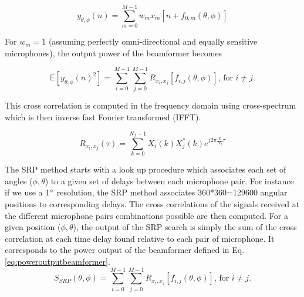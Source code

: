 \begin{equation}
    y_{\theta,\phi}(n)=\sum\limits_{m=0}^{M-1}{w_m x_m[n + f_{0,m}(\theta,\phi)]} 
\end{equation}


For $w_m=1$ (assuming perfectly omni-directional and equally sensitive microphones), the output power of the beamformer becomes

\begin{equation}
    \mathbb{E}[{y_{\theta,\phi}(n)^2}]=\sum\limits_{i=0}^{M-1}\sum\limits_{j=0}^{M-1}{R_{x_i,x_j}[f_{i,j}(\theta,\phi)]} \text{, for } i\neq j.
    \label{eq:poweroutputbeamformer}
\end{equation}

This cross correlation is computed in the frequency domain using cross-spectrum which is then inverse fast Fourier transformed (IFFT).

\begin{equation}
    R_{x_i,x_j}(\tau)= \sum\limits_{k=0}^{N_{f}-1}{X_{i}(k)X_{j}^*(k)e^{j2\pi\frac{k}{N_{f}}\tau}}
\end{equation}


The SRP method starts with a look up procedure which associates each set of angles ($\phi,\theta$) to a given set of delays between each microphone pair. For instance if we use a 1$\degree$  resolution, the SRP method associates 360*360=129600 angular positions to corresponding delays. The cross correlations of the signals received at the different microphone pairs combinations possible are then computed. For a given position ($\phi,\theta$), the output of the SRP search is simply the sum of the cross correlation at each time delay found relative to each pair of microphone. It corresponds to the power output of the beamformer defined in Eq. \ref{eq:poweroutputbeamformer}. 
\begin{equation}
    S_{SRP}(\theta,\phi)=\sum\limits_{i=0}^{M-1}\sum\limits_{j=0}^{M-1}{R_{x_i,x_j}[f_{i,j}(\theta,\phi)]} \text{, for } i\neq j.
     \label{eq:srpSum}
\end{equation}

